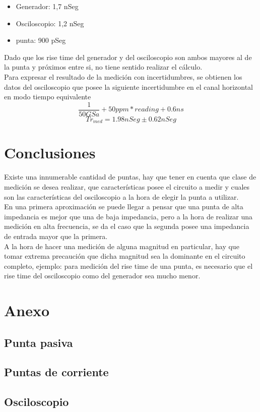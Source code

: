 \documentclass[a4paper,10pt]{article}
\begin{document}
		\begin{itemize}
			\item Generador: 1,7 nSeg  
			\item Osciloscopio: 1,2 nSeg
			\item punta: 900 pSeg
		\end{itemize}
		\indent Dado que los rise time del generador y del osciloscopio son 
		ambos mayores al de la punta y próximos entre si, no tiene sentido 
		realizar el cálculo. \\
		\indent Para expresar el resultado de la medición con incertidumbres,
		se obtienen los datos del osciloscopio que posee la siguiente 
		incertidumbre en el canal horizontal en modo tiempo equivalente
		$$ \frac{1}{50GSa} + 50ppm * reading + 0.6 ns$$
		$$ Tr_{med} = 1.98 nSeg \pm 0.62 nSeg$$

	\newpage
	\section{Conclusiones}
	\indent Existe una innumerable cantidad de puntas, hay que tener en cuenta
	que clase de medición se desea realizar, que características posee el 
	circuito a medir y cuales son las características del osciloscopio a la 
	hora de elegir la punta a utilizar. \\
	\indent En una primera aproximación se puede llegar a pensar que una punta
	de alta impedancia es mejor que una de baja impedancia, pero a la hora de
	realizar una medición en alta frecuencia, se da el caso que la segunda 
	posee una impedancia de entrada mayor que la primera.\\
	\indent A la hora de hacer una medición de alguna magnitud en particular,
	hay que tomar extrema precaución que dicha magnitud sea la dominante en el
	circuito completo, ejemplo: para medición del rise time de una punta, es 
	necesario que el rise time del osciloscopio como del generador sea mucho 
	menor. 
	
	\newpage
	\section{Anexo}
	\subsection{Punta pasiva}
	

	\newpage
	\subsection{Puntas de corriente}
	
	
	
	\newpage
	\subsection{Osciloscopio}
	
\end{document}
